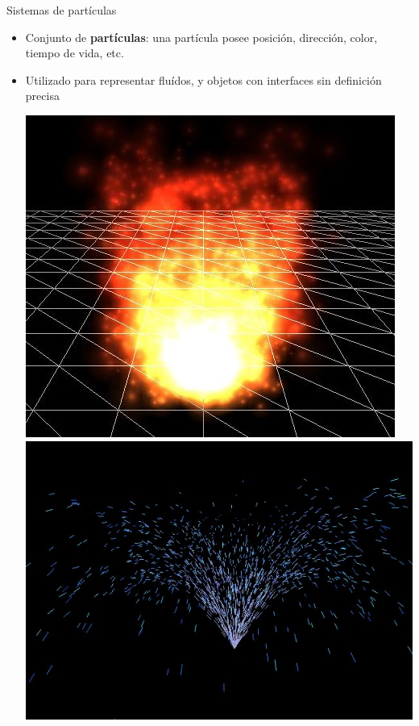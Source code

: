 \documentclass[spanish,unknownkeysallowed]{beamer}
\begin{document}
\begin{frame}{Sistemas de partículas}
\begin{itemize}
\item Conjunto de \textbf{partículas}: una partícula posee posición, dirección, color, tiempo de vida, etc.
\item Utilizado para representar fluídos, y objetos con interfaces sin definición precisa

\includegraphics[scale = 0.3]{../figures/fire}
\includegraphics[scale = 0.277]{../figures/fireworks}
\end{itemize}
\end{frame}
\end{document}
